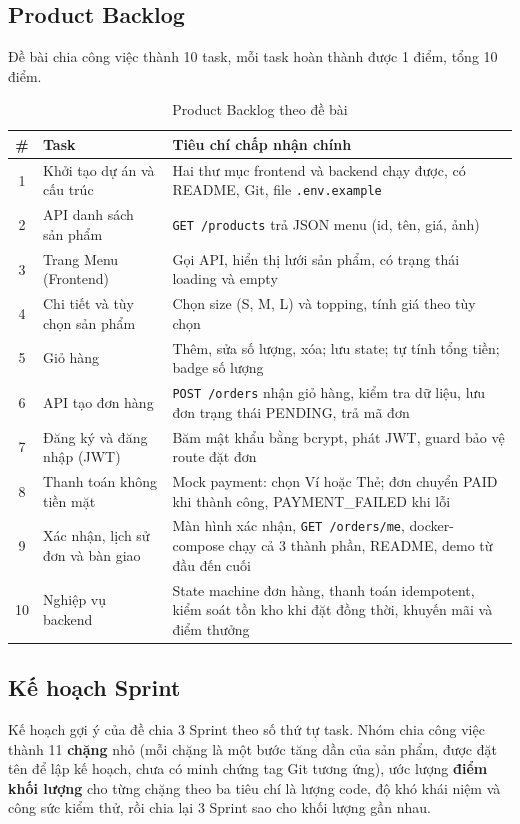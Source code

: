 \documentclass[a4paper]{article}
\begin{document}
\subsection{Product Backlog}
Đề bài chia công việc thành 10 task, mỗi task hoàn thành được 1 điểm, tổng 10 điểm.
\begin{table}[h!]
\centering
\footnotesize
\begin{tabularx}{\textwidth}{|c|l|X|}
\hline
\textbf{\#} & \textbf{Task} & \textbf{Tiêu chí chấp nhận chính} \\ \hline
1 & Khởi tạo dự án và cấu trúc & Hai thư mục frontend và backend chạy được, có README, Git, file \texttt{.env.example} \\ \hline
2 & API danh sách sản phẩm & \texttt{GET /products} trả JSON menu (id, tên, giá, ảnh) \\ \hline
3 & Trang Menu (Frontend) & Gọi API, hiển thị lưới sản phẩm, có trạng thái loading và empty \\ \hline
4 & Chi tiết và tùy chọn sản phẩm & Chọn size (S, M, L) và topping, tính giá theo tùy chọn \\ \hline
5 & Giỏ hàng & Thêm, sửa số lượng, xóa; lưu state; tự tính tổng tiền; badge số lượng \\ \hline
6 & API tạo đơn hàng & \texttt{POST /orders} nhận giỏ hàng, kiểm tra dữ liệu, lưu đơn trạng thái PENDING, trả mã đơn \\ \hline
7 & Đăng ký và đăng nhập (JWT) & Băm mật khẩu bằng bcrypt, phát JWT, guard bảo vệ route đặt đơn \\ \hline
8 & Thanh toán không tiền mặt & Mock payment: chọn Ví hoặc Thẻ; đơn chuyển PAID khi thành công, PAYMENT\_FAILED khi lỗi \\ \hline
9 & Xác nhận, lịch sử đơn và bàn giao & Màn hình xác nhận, \texttt{GET /orders/me}, docker-compose chạy cả 3 thành phần, README, demo từ đầu đến cuối \\ \hline
10 & Nghiệp vụ backend & State machine đơn hàng, thanh toán idempotent, kiểm soát tồn kho khi đặt đồng thời, khuyến mãi và điểm thưởng \\ \hline
\end{tabularx}
\caption{Product Backlog theo đề bài}
\end{table}

\subsection{Kế hoạch Sprint}
Kế hoạch gợi ý của đề chia 3 Sprint theo số thứ tự task. Nhóm chia công việc thành 11 \textbf{chặng} nhỏ (mỗi chặng là một bước tăng dần của sản phẩm, được đặt tên để lập kế hoạch, chưa có minh chứng tag Git tương ứng), ước lượng \textbf{điểm khối lượng} cho từng chặng theo ba tiêu chí là lượng code, độ khó khái niệm và công sức kiểm thử, rồi chia lại 3 Sprint sao cho khối lượng gần nhau.
\end{document}
